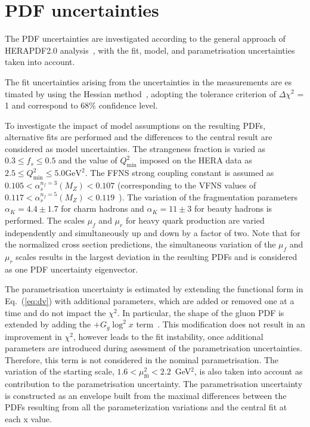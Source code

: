 \documentclass[12pt]{article}
\begin{document}
\section{PDF uncertainties}
\label{sec:pdfparam}

The PDF uncertainties are investigated according to the general approach of HERAPDF2.0 analysis~\cite{Abramowicz:2015mha}, with the fit, model, and parametrisation uncertainties taken into account.

The fit uncertainties arising from the uncertainties in the measurements are es timated by using the Hessian method~\cite{Pumplin:2001ct}, adopting the tolerance criterion of $\Delta \chi^2$ = 1 and correspond to 68\% confidence level.

To investigate the impact of model assumptions on the resulting PDFs, alternative fits are performed and the differences to the central result are considered as model uncertainties. The strangeness fraction is varied as $0.3 \leq f_{s} \leq 0.5$ and the value of $Q^2_{\text{min}}$ imposed on the HERA data as $2.5 \leq Q^2_\textrm{min}\leq 5.0\textrm{GeV}^2$. The FFNS strong coupling constant is assumed as $0.105 < \alpha_s^{n_f=3}(M_Z) < 0.107$ (corresponding to the VFNS values of $0.117 < \alpha_s^{n_f=5}(M_Z) < 0.119$~\cite{Tanabashi:2018oca}). The variation of the fragmentation parameters $\alpha_K = 4.4 \pm 1.7$ for charm hadrons and $\alpha_K = 11 \pm 3$ for beauty hadrons is performed.
The scales $\mu_f$ and $\mu_r$ for heavy quark production are varied independently and simultaneously up and down by a factor of two. Note that for 
the normalized cross section predictions, the simultaneous variation of the $\mu_f$ and $\mu_r$ scales results in the largest deviation in the 
resulting PDFs and is considered as one PDF uncertainty eigenvector.

The parametrisation uncertainty is estimated by extending the functional form in Eq.~(\ref{eq:dv}) with additional parameters, 
which are added or removed one at a time and do not impact the $\chi^2$. 
In particular, the shape of the gluon PDF is extended by adding the $+G_g\log^2 x$ term~\cite{Bonvini:2019wxf}. This modification does not result in an improvement in $\chi^2$, however leads to the fit instability, once additional parameters are introduced during asessment of the parametrisation uncertainties. Therefore, this term is not considered in the nominal parametrisation. 
The variation of the starting scale, $1.6 < \mu_\mathrm{f0}^2 < 2.2$~GeV$^2$, is also taken into account as contribution to the parametrisation uncertainty. The parametrisation uncertainty is constructed as an envelope built from the maximal differences between the PDFs resulting from all the parameterization variations and the central fit at each x value.
\end{document}
